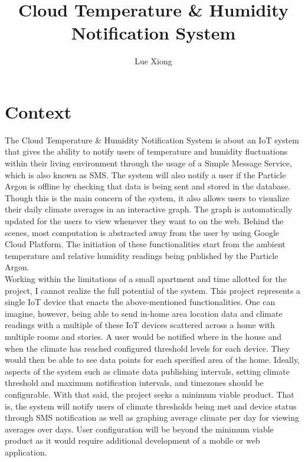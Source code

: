 \documentclass{article}
\title{Cloud Temperature \& Humidity Notification System}
\author{Lue Xiong}
\begin{document}
\maketitle
\newpage

\tableofcontents
\newpage

\obeylines

\section{Context}
The Cloud Temperature \& Humidity Notification System is about an IoT system that gives the ability to notify users of temperature and humidity fluctuations within their living environment through the usage of a Simple Message Service, which is also known as SMS. The system will also notify a user if the Particle Argon is offline by checking that data is being sent and stored in the database. Though this is the main concern of the system, it also allows users to visualize their daily climate averages in an interactive graph. The graph is automatically updated for the users to view whenever they want to on the web. Behind the scenes, most computation is abstracted away from the user by using Google Cloud Platform. The initiation of these functionalities start from the ambient temperature and relative humidity readings being published by the Particle Argon.\\

Working within the limitations of a small apartment and time allotted for the project, I cannot realize the full potential of the system. This project represents a single IoT device that enacts the above-mentioned functionalities. One can imagine, however, being able to send in-home area location data and climate readings with a multiple of these IoT devices scattered across a home with multiple rooms and stories. A user would be notified where in the house and when the climate has reached configured threshold levels for each device. They would then be able to see data points for each specified area of the home. Ideally, aspects of the system such as climate data publishing intervals, setting climate threshold and maximum notification intervals, and timezones should be configurable. With that said, the project seeks a minimum viable product. That is, the system will notify users of climate thresholds being met and device status through SMS notification as well as graphing average climate per day for viewing averages over days. User configuration will be beyond the minimum viable product as it would require additional development of a mobile or web application.\\
\end{document}
